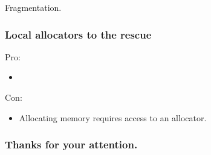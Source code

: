 \documentclass[aspectratio=43]{beamer}
\begin{document}
\begin{frame}[fragile]
\begin{itemize}
Fragmentation.
    \end{itemize}
\end{frame}

\begin{frame}[fragile]
  \frametitle{Local allocators to the rescue}
    Pro:
    \begin{itemize}
    \item 
    \end{itemize}

    Con:
    \begin{itemize}
    \item Allocating memory requires access to an allocator.
    \end{itemize}
\end{frame}
\fi

\begin{frame}
  \frametitle{Thanks for your attention.}
\end{frame}
\end{document}
